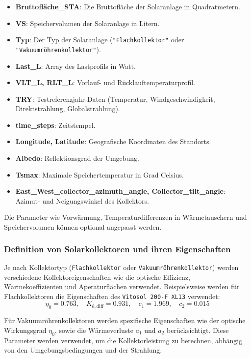 \begin{itemize}
    \item \textbf{Bruttofläche\_STA}: Die Bruttofläche der Solaranlage in Quadratmetern.
    \item \textbf{VS}: Speichervolumen der Solaranlage in Litern.
    \item \textbf{Typ}: Der Typ der Solaranlage (\texttt{"Flachkollektor"} oder \texttt{"Vakuumröhrenkollektor"}).
    \item \textbf{Last\_L}: Array des Lastprofils in Watt.
    \item \textbf{VLT\_L, RLT\_L}: Vorlauf- und Rücklauftemperaturprofil.
    \item \textbf{TRY}: Testreferenzjahr-Daten (Temperatur, Windgeschwindigkeit, Direktstrahlung, Globalstrahlung).
    \item \textbf{time\_steps}: Zeitstempel.
    \item \textbf{Longitude, Latitude}: Geografische Koordinaten des Standorts.
    \item \textbf{Albedo}: Reflektionsgrad der Umgebung.
    \item \textbf{Tsmax}: Maximale Speichertemperatur in Grad Celsius.
    \item \textbf{East\_West\_collector\_azimuth\_angle, Collector\_tilt\_angle}: Azimut- und Neigungswinkel des Kollektors.
\end{itemize}

Die Parameter wie Vorwärmung, Temperaturdifferenzen in Wärmetauschern und Speichervolumen können optional angepasst werden.

\subsubsection{Definition von Solarkollektoren und ihren Eigenschaften}

Je nach Kollektortyp (\texttt{Flachkollektor} oder \texttt{Vakuumröhrenkollektor}) werden verschiedene Kollektoreigenschaften wie die optische Effizienz, Wärmekoeffizienten und Aperaturflächen verwendet. Beispielsweise werden für Flachkollektoren die Eigenschaften des \texttt{Vitosol 200-F XL13} verwendet:
\[
\eta_0 = 0.763, \quad K_{\theta,\text{diff}} = 0.931, \quad c_1 = 1.969, \quad c_2 = 0.015
\]

Für Vakuumröhrenkollektoren werden spezifische Eigenschaften wie der optische Wirkungsgrad \( \eta_0 \), sowie die Wärmeverluste \( a_1 \) und \( a_2 \) berücksichtigt. Diese Parameter werden verwendet, um die Kollektorleistung zu berechnen, abhängig von den Umgebungsbedingungen und der Strahlung.

